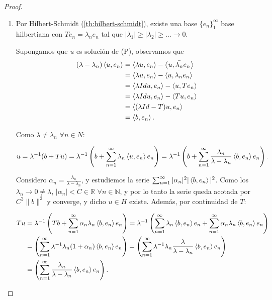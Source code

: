 \begin{proof}\hfill
  \begin{enumerate}
    \item
      Por Hilbert-Schmidt (\ref{th:hilbert-schmidt}), existe una base
      $\{e_n\}_1^\infty$ base hilbertiana con $Te_n=\lambda_n e_n$ tal que
      $|\lambda_1|\ge |\lambda_2|\ge \ldots \to 0$.


      Supongamos que $u$ es solución de (P), observamos que
      \begin{align*}
        (\lambda-\lambda_n)\left\langle u,e_n\right\rangle &= \left\langle\lambda u,e_n\right\rangle - \left\langle u,\bar{\lambda_n} e_n\right\rangle\\
                                         &= \left\langle\lambda u,e_n\right\rangle - \left\langle u,\lambda_n e_n\right\rangle\\
                                         &= \left\langle\lambda Id u,e_n\right\rangle - \left\langle u,Te_n\right\rangle\\
                                         &= \left\langle\lambda Id u,e_n\right\rangle - \left\langle Tu,e_n\right\rangle \\
                                         &= \left\langle(\lambda Id - T) u,e_n\right\rangle \\
                                         &= \left\langle b,e_n\right\rangle
      .\end{align*}

      Como $\lambda\neq \lambda_n$ $\forall n\in N$:

      \[
      u=\lambda^{-1}(b+Tu)=
      \lambda^{-1}\left(b+\sum_{n=1}^{\infty} \lambda_n\left\langle u,e_n\right\rangle e_n\right)=
      \lambda^{-1}\left(b+\sum_{n=1}^{\infty}
      \frac{\lambda_n}{\lambda-\lambda_n}\left\langle b,e_n\right\rangle e_n\right)
      .\] 

      Considero $\alpha_n=\frac{\lambda_n}{\lambda-\lambda_n}$, y estudiemos la
      serie $\sum_{n=1}^{\infty} |\alpha_n|^2|\left\langle b,e_n\right\rangle|^2$. Como los
      $\lambda_n\to 0\neq \lambda$, $|\alpha_n|<C\in \mathbb{R}$ $\forall n\in
      \mathbb{N}$, y por lo tanto la serie queda acotada por $C^2\|b\|^2$ y
      converge, y dicho $u\in H$ existe. Además, por continuidad de $T$:

      \begin{align*}
        Tu &= \lambda^{-1}\left( Tb+\sum_{n=1}^{\infty} \alpha_n \lambda_n \left\langle b,e_n\right\rangle e_n \right)
           = \lambda^{-1}\left( \sum_{n=1}^{\infty} \lambda_n \left\langle b,e_n\right\rangle e_n + \sum_{n=1}^{\infty} \alpha_n \lambda_n \left\langle b,e_n\right\rangle e_n \right)\\
           &= \left( \sum_{n=1}^{\infty} \lambda^{-1}\lambda_n(1+\alpha_n) \left\langle b,e_n\right\rangle e_n \right)
           = \left( \sum_{n=1}^{\infty} \lambda^{-1}\lambda_n \frac{\lambda}{\lambda-\lambda_n} \left\langle b,e_n\right\rangle e_n \right)\\
           &= \left( \sum_{n=1}^{\infty} \frac{\lambda_n}{\lambda-\lambda_n} \left\langle b,e_n\right\rangle e_n \right)
      .\end{align*}


\end{enumerate}
\end{proof}
